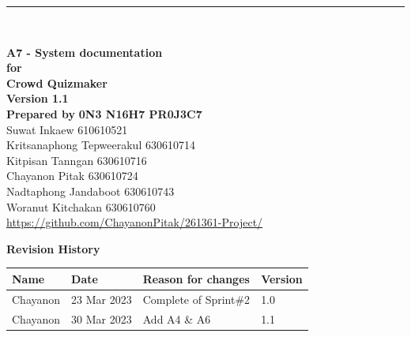 \documentclass[ 10pt]{report}
\begin{document}
    \begin{titlepage}
        \noindent\rule{\textwidth}{5pt} \\
        \begin{flushright}
            \Huge\textbf{A7 - System documentation} \\[2\baselineskip]
            \large\textbf{for} \\
            \huge\textbf{Crowd Quizmaker} \\[2\baselineskip]
            \large\textbf{Version 1.1} \\[2\baselineskip]
            \large\textbf{Prepared by} \LARGE\textbf{0N3 N16H7 PR0J3C7} \\[0.5\baselineskip]
            \normalsize{
                Suwat Inkaew 610610521 \\
                Kritsanaphong Tepweerakul 630610714 \\
                Kitpisan Tanngan 630610716 \\
                Chayanon Pitak 630610724 \\
                Nadtaphong Jandaboot 630610743 \\
                Woranut Kitchakan 630610760
            } \\[2\baselineskip]
            \large{\href{https://github.com/ChayanonPitak/261361-Project/}{https://github.com/ChayanonPitak/261361-Project/}}
        \end{flushright}
        \pagebreak

        \LARGE\textbf{Revision History} \\[0.5\baselineskip]
        \normalsize{
            \begin{tabular}{| m{8em} | m{6em} | m{20em} | m{5em} |}
                \hline
                \textbf{Name} & \textbf{Date} & \textbf{Reason for changes} & \textbf{Version}\\ 
                \hline\hline
                Chayanon & 23 Mar 2023 & Complete of Sprint\#2 & 1.0 \\
                \hline
                Chayanon & 30 Mar 2023 & Add A4 \& A6 & 1.1 \\
                \hline
            \end{tabular}
        }

    \end{titlepage}


     \renewcommand*\contentsname{Table of Contents}
     \tableofcontents
     \pagebreak
\end{document}

